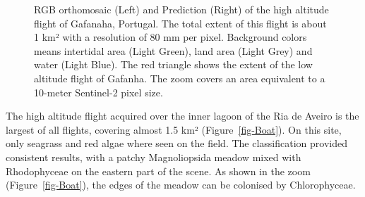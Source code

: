 \documentclass[
  number]{elsarticle}
\begin{document}
\label{cell-fig-GafHigh}
\begin{figure}[H]


\caption{\label{fig-GafHigh}RGB orthomosaic (Left) and Prediction
(Right) of the high altitude flight of Gafanaha, Portugal. The total
extent of this flight is about 1 km² with a resolution of 80 mm per
pixel. Background colors means intertidal area (Light Green), land area
(Light Grey) and water (Light Blue). The red triangle shows the extent
of the low altitude flight of Gafanha. The zoom covers an area
equivalent to a 10-meter Sentinel-2 pixel size.}

\end{figure}%

The high altitude flight acquired over the inner lagoon of the Ria de
Aveiro is the largest of all flights, covering almost 1.5 km²
(Figure~\ref{fig-Boat}). On this site, only seagrass and red algae where
seen on the field. The classification provided consistent results, with
a patchy Magnoliopsida meadow mixed with Rhodophyceae on the eastern
part of the scene. As shown in the zoom (Figure~\ref{fig-Boat}), the
edges of the meadow can be colonised by Chlorophyceae.
\end{document}
